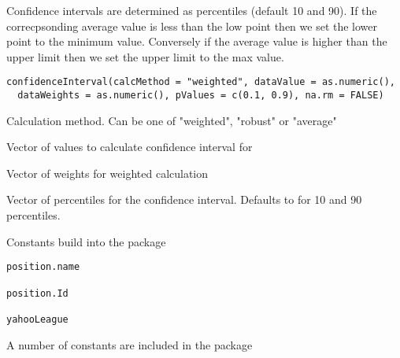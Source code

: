 \documentclass[a4paper]{book}
\begin{document}
%
\begin{Description}\relax
Confidence intervals are determined as percentiles (default 10 and 90).
If the correcpsonding average value is less than the low point then we
set the lower point to the minimum value. Conversely if the average value is
higher than the upper limit then we set the upper limit to the max value.
\end{Description}
%
\begin{Usage}
\begin{verbatim}
confidenceInterval(calcMethod = "weighted", dataValue = as.numeric(),
  dataWeights = as.numeric(), pValues = c(0.1, 0.9), na.rm = FALSE)
\end{verbatim}
\end{Usage}
%
\begin{Arguments}
\begin{ldescription}
\item[\code{calcMethod}] Calculation method. Can be one of "weighted", "robust" or
"average"

\item[\code{dataValue}] Vector of values to calculate confidence interval for

\item[\code{dataWeights}] Vector of weights for weighted calculation

\item[\code{pValues}] Vector of percentiles for the confidence interval. Defaults to
 for 10 and 90 percentiles.
\end{ldescription}
\end{Arguments}
%
\begin{Description}\relax
Constants build into the package
\end{Description}
%
\begin{Usage}
\begin{verbatim}
position.name

position.Id

yahooLeague
\end{verbatim}
\end{Usage}
%
\begin{Details}\relax
A number of constants are included in the package
\end{Details}
\end{document}
